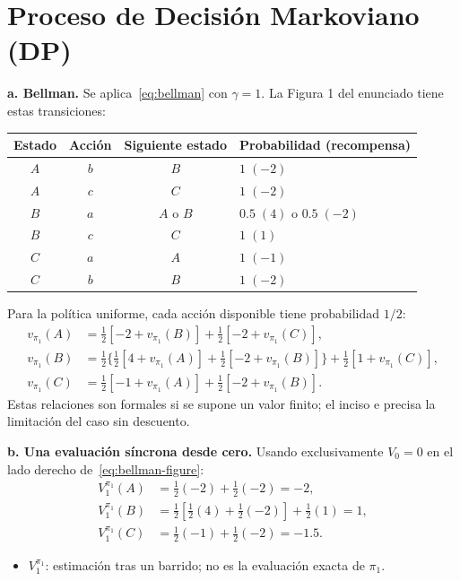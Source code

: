 \section{Proceso de Decisión Markoviano (DP)}

\textbf{a. Bellman.} Se aplica~\eqref{eq:bellman} con $\gamma=1$. La Figura 1 del enunciado tiene estas transiciones:
\begin{center}
\begin{tabular}{cccl}
\toprule
Estado & Acción & Siguiente estado & Probabilidad (recompensa)\\
\midrule
$A$ & $b$ & $B$ & $1\;(-2)$\\
$A$ & $c$ & $C$ & $1\;(-2)$\\
$B$ & $a$ & $A$ o $B$ & $0.5\;(4)$ o $0.5\;(-2)$\\
$B$ & $c$ & $C$ & $1\;(1)$\\
$C$ & $a$ & $A$ & $1\;(-1)$\\
$C$ & $b$ & $B$ & $1\;(-2)$\\
\bottomrule
\end{tabular}
\end{center}
Para la política uniforme, cada acción disponible tiene probabilidad $1/2$:
\begin{equation}\label{eq:bellman-figure}
\begin{aligned}
    v_{\pi_1}(A)&=\tfrac12[-2+v_{\pi_1}(B)]+\tfrac12[-2+v_{\pi_1}(C)],\\
    v_{\pi_1}(B)&=\tfrac12\{\tfrac12[4+v_{\pi_1}(A)]+\tfrac12[-2+v_{\pi_1}(B)]\}
                   +\tfrac12[1+v_{\pi_1}(C)],\\
    v_{\pi_1}(C)&=\tfrac12[-1+v_{\pi_1}(A)]+\tfrac12[-2+v_{\pi_1}(B)].
\end{aligned}
\end{equation}
Estas relaciones son formales si se supone un valor finito; el inciso e precisa la limitación del caso sin descuento.

\textbf{b. Una evaluación síncrona desde cero.} Usando exclusivamente $V_0=0$ en el lado derecho de~\eqref{eq:bellman-figure}:
\begin{equation}\label{eq:first-sweep}
\begin{aligned}
    V^{\pi_1}_1(A)&=\tfrac12(-2)+\tfrac12(-2)=-2,\\
    V^{\pi_1}_1(B)&=\tfrac12[\tfrac12(4)+\tfrac12(-2)]+\tfrac12(1)=1,\\
    V^{\pi_1}_1(C)&=\tfrac12(-1)+\tfrac12(-2)=-1.5.
\end{aligned}
\end{equation}
\begin{itemize}
    \item $V^{\pi_1}_1$: estimación tras un barrido; no es la evaluación exacta de $\pi_1$.
\end{itemize}

